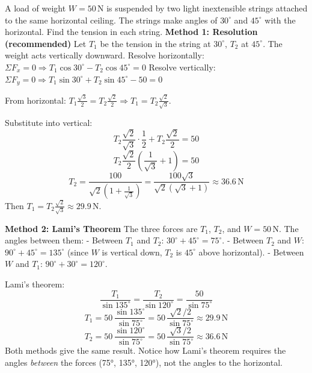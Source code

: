 \documentclass[11pt]{article}
\begin{document}
\begin{exoresolu}
A load of weight \(W = 50\,\mathrm{N}\) is suspended by two light inextensible strings attached to the same horizontal ceiling. The strings make angles of \(30^\circ\) and \(45^\circ\) with the horizontal. Find the tension in each string.
\tcblower
\textbf{Method 1: Resolution (recommended)}
Let \(T_1\) be the tension in the string at \(30^\circ\), \(T_2\) at \(45^\circ\). The weight acts vertically downward.
Resolve horizontally: \(\Sigma F_x = 0 \Rightarrow T_1\cos30^\circ - T_2\cos45^\circ = 0\)
Resolve vertically: \(\Sigma F_y = 0 \Rightarrow T_1\sin30^\circ + T_2\sin45^\circ - 50 = 0\)

From horizontal: \(T_1\frac{\sqrt{3}}{2} = T_2\frac{\sqrt{2}}{2} \Rightarrow T_1 = T_2\frac{\sqrt{2}}{\sqrt{3}}\).

Substitute into vertical:
\[
T_2\frac{\sqrt{2}}{\sqrt{3}}\cdot\frac{1}{2} + T_2\frac{\sqrt{2}}{2} = 50
\]
\[
T_2\frac{\sqrt{2}}{2}\left(\frac{1}{\sqrt{3}} + 1\right) = 50
\]
\[
T_2 = \frac{100}{\sqrt{2}\left(1+\frac{1}{\sqrt{3}}\right)} = \frac{100\sqrt{3}}{\sqrt{2}(\sqrt{3}+1)} \approx 36.6\,\mathrm{N}
\]
Then \(T_1 = T_2\frac{\sqrt{2}}{\sqrt{3}} \approx 29.9\,\mathrm{N}\).

\textbf{Method 2: Lami's Theorem}
The three forces are \(T_1\), \(T_2\), and \(W=50\,\mathrm{N}\). The angles between them:
- Between \(T_1\) and \(T_2\): \(30^\circ+45^\circ = 75^\circ\).
- Between \(T_2\) and \(W\): \(90^\circ+45^\circ = 135^\circ\) (since \(W\) is vertical down, \(T_2\) is \(45^\circ\) above horizontal).
- Between \(W\) and \(T_1\): \(90^\circ+30^\circ = 120^\circ\).

Lami's theorem:
\[
\frac{T_1}{\sin135^\circ} = \frac{T_2}{\sin120^\circ} = \frac{50}{\sin75^\circ}
\]
\[
T_1 = 50\,\frac{\sin135^\circ}{\sin75^\circ} = 50\,\frac{\sqrt{2}/2}{\sin75^\circ} \approx 29.9\,\mathrm{N}
\]
\[
T_2 = 50\,\frac{\sin120^\circ}{\sin75^\circ} = 50\,\frac{\sqrt{3}/2}{\sin75^\circ} \approx 36.6\,\mathrm{N}
\]
Both methods give the same result. Notice how Lami's theorem requires the angles \emph{between} the forces (75°, 135°, 120°), not the angles to the horizontal.
\end{exoresolu}
\end{document}
